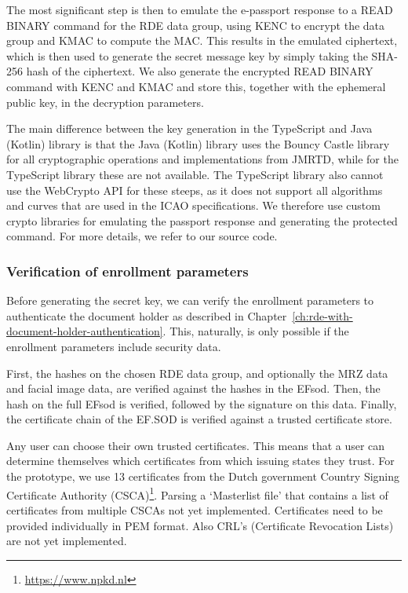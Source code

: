 The most significant step is then to emulate the e-passport response to a READ BINARY command for the RDE data group, using KENC to encrypt the data group and KMAC to compute the MAC.
This results in the emulated ciphertext, which is then used to generate the secret message key by simply taking the SHA-256 hash of the ciphertext.
We also generate the encrypted READ BINARY command with KENC and KMAC and store this, together with the ephemeral public key, in the decryption parameters.

The main difference between the key generation in the TypeScript and Java (Kotlin) library is that the Java (Kotlin) library uses the Bouncy Castle library for all cryptographic operations and implementations from JMRTD, while for the TypeScript library these are not available.
The TypeScript library also cannot use the WebCrypto API for these steeps, as it does not support all algorithms and curves that are used in the ICAO specifications.
We therefore use custom crypto libraries for emulating the passport response and generating the protected command.
For more details, we refer to our source code.

\subsubsection{Verification of enrollment parameters}\label{subsubsec:verification-of-enrollment-parameters}
Before generating the secret key, we can verify the enrollment parameters to authenticate the document holder as described in Chapter~\ref{ch:rde-with-document-holder-authentication}.
This, naturally, is only possible if the enrollment parameters include security data.

First, the hashes on the chosen RDE data group, and optionally the MRZ data and facial image data, are verified against the hashes in the EFsod.
Then, the hash on the full EFsod is verified, followed by the signature on this data.
Finally, the certificate chain of the EF.SOD is verified against a trusted certificate store.

Any user can choose their own trusted certificates.
This means that a user can determine themselves which certificates from which issuing states they trust.
For the prototype, we use 13 certificates from the Dutch government Country Signing Certificate Authority (CSCA)\footnote{\url{https://www.npkd.nl}}.
Parsing a `Masterlist file' that contains a list of certificates from multiple CSCAs not yet implemented.
Certificates need to be provided individually in PEM format.
Also CRL's (Certificate Revocation Lists) are not yet implemented.

